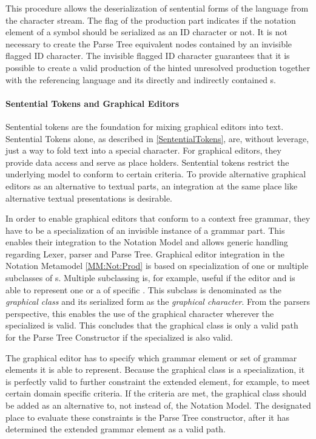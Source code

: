 This procedure allows the deserialization of sentential forms of the language from the character stream. The  flag of the production part indicates if the notation element of a symbol should be serialized as an ID character or not. It is not necessary to create the Parse Tree equivalent nodes contained by an invisible flagged ID character. The invisible flagged ID character guarantees that it is possible to create a valid production of the hinted unresolved production together with the referencing language  and its directly and indirectly contained s.

\paragraph{Sentential Tokens and Graphical Editors}
Sentential tokens are the foundation for mixing graphical editors into text. Sentential Tokens alone, as described in \ref{SententialTokens}, are, without leverage, just a way to fold text into a special character.  For graphical editors, they provide data access and serve as place holders. Sentential tokens restrict the underlying model to conform to certain criteria. To provide alternative graphical editors as an alternative to textual parts, an integration at the same place like alternative textual presentations is desirable.

In order to enable graphical editors that conform to a context free grammar, they have to be a specialization of an invisible instance of a grammar part. This enables their integration to the Notation Model and allows generic handling regarding Lexer, parser and Parse Tree. Graphical editor integration in the Notation Metamodel \ref{MM:Not:Prod} is based on specialization of one or multiple subclasses of s. Multiple subclassing is, for example, useful if the editor and is able to represent one or a  of specific . This subclass is denominated as the \emph{graphical class} and its serialized form as the \emph{graphical character}. From the parsers perspective, this enables the use of the graphical character wherever the specialized  is valid. This concludes that the graphical class is only a valid path for the Parse Tree Constructor if the specialized  is also valid. 

The graphical editor has to specify which grammar element or set of grammar elements it is able to represent. Because the graphical class is a specialization, it is perfectly valid to further constraint the extended element, for example, to meet certain domain specific criteria. If the criteria are met, the graphical class should be added as an alternative to, not instead of, the Notation Model. The designated place to evaluate these constraints is the Parse Tree constructor, after it has determined the extended grammar element as a valid path. 

